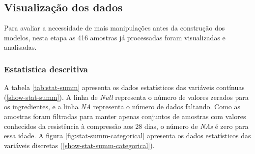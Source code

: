 \documentclass[]{article}
\begin{document}
\begin{table}[H]

\caption{\label{tab:new-features-table}Novas variáveis}
\centering
{}
\end{table}

\hypertarget{visualizauxe7uxe3o-dos-dados}{%
\subsection{Visualização dos dados}\label{visualizauxe7uxe3o-dos-dados}}

Para avaliar a necessidade de mais manipulações antes da construção dos
modelos, nesta etapa as 416 amostras já processadas foram visualizadas e
analisadas.

\hypertarget{estatistica-descritiva}{%
\subsubsection{Estatistica descritiva}\label{estatistica-descritiva}}

A tabela \ref{tab:stat-summ} apresenta os dados estatísticos das
variáveis contínuas (\ref{show-stat-summ}). A linha de \emph{Null}
representa o número de valores zerados para os ingredientes, e a linha
\emph{NA} representa o número de dados faltando. Como as amostras foram
filtradas para manter apenas conjuntos de amostras com valores
conhecidos da resistência à compressão aos 28 dias, o número de
\emph{NAs} é zero para essa idade. A figura
\ref{fig:stat-summ-categorical} apresenta os dados estatísticos das
variáveis discretas (\ref{show-stat-summ-categorical}).
\end{document}
